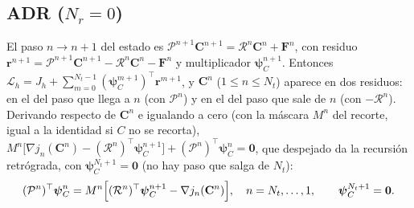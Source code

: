 \documentclass[11pt]{article}
\numberwithin{equation}{section}
\theoremstyle{plain}
\theoremstyle{definition}
\theoremstyle{remark}
\begin{document}
\subsection{ADR ($N_r=0$)}
El paso $n\to n+1$ del estado es $\mathcal{P}^{n+1}\mathbf{C}^{n+1}=\mathcal{R}^{n}\mathbf{C}^n+\mathbf{F}^n$, con
residuo $\mathbf{r}^{n+1}=\mathcal{P}^{n+1}\mathbf{C}^{n+1}-\mathcal{R}^{n}\mathbf{C}^n-\mathbf{F}^n$ y
multiplicador $\boldsymbol\psi_C^{n+1}$. Entonces
$\mathcal{L}_h=J_h+\sum_{m=0}^{N_t-1}(\boldsymbol\psi_C^{m+1})^\top\mathbf{r}^{m+1}$, y $\mathbf{C}^n$ ($1\le n\le N_t$)
aparece en dos residuos: en el del paso que llega a $n$ (con $\mathcal{P}^{n}$) y en el del paso que sale de $n$
(con $-\mathcal{R}^{n}$). Derivando respecto de $\mathbf{C}^n$ e igualando a cero (con la máscara $M^n$ del recorte, igual a la identidad si $C$ no se recorta),
$M^n\bigl[\nabla j_n(\mathbf{C}^n)-(\mathcal{R}^{n})^\top\boldsymbol\psi_C^{n+1}\bigr]+(\mathcal{P}^{n})^\top\boldsymbol\psi_C^{n}=\mathbf{0}$,
que despejado da la recursión retrógrada, con $\boldsymbol\psi_C^{N_t+1}=\mathbf{0}$ (no hay paso que salga de $N_t$):
\begin{equation}
(\mathcal{P}^{n})^\top\boldsymbol\psi_C^{n}=M^n\Bigl[(\mathcal{R}^{n})^\top\boldsymbol\psi_C^{n+1}
-\nabla j_n(\mathbf{C}^n)\Bigr],\quad n=N_t,\dots,1,\qquad\boldsymbol\psi_C^{N_t+1}=\mathbf{0}.
\label{eq:disc_adr}
\end{equation}
\end{document}

